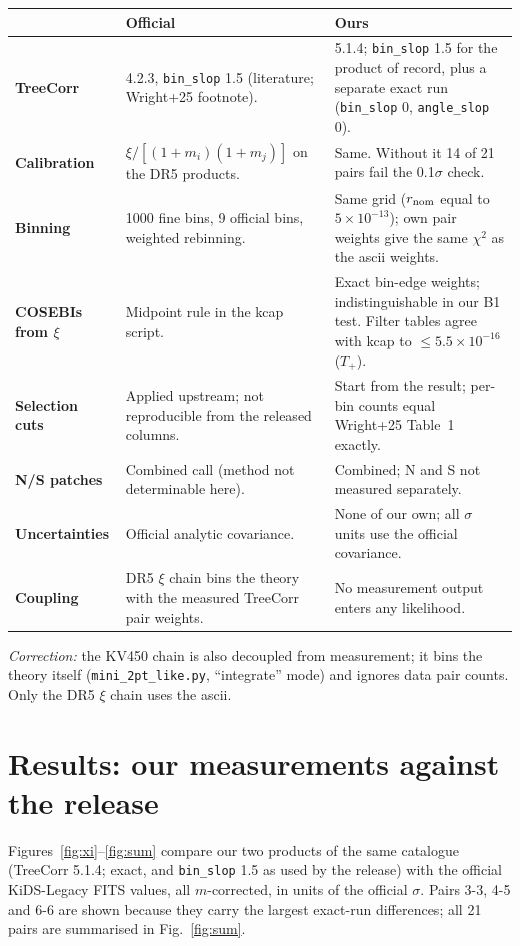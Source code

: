 \documentclass[10pt,a4paper]{article}
\newcommand{\file}[1]{{\small\texttt{#1}}}
\begin{document}
\begin{tabularx}{\textwidth}{@{}>{\bfseries}p{2.6cm}YY@{}}
\toprule
 & Official & Ours \\
\midrule
TreeCorr & 4.2.3, \texttt{bin\_slop} 1.5 (literature; Wright+25 footnote). & 5.1.4; \texttt{bin\_slop} 1.5 for the product of record, plus a separate exact run (\texttt{bin\_slop} 0, \texttt{angle\_slop} 0). \\
Calibration & $\xi/[(1+m_i)(1+m_j)]$ on the DR5 products. & Same. Without it 14 of 21 pairs fail the 0.1$\sigma$ check. \\
Binning & 1000 fine bins, 9 official bins, weighted rebinning. & Same grid ($r_{\rm nom}$ equal to $5\times10^{-13}$); own pair weights give the same $\chi^2$ as the ascii weights. \\
COSEBIs from $\xi$ & Midpoint rule in the kcap script. & Exact bin-edge weights; indistinguishable in our B1 test. Filter tables agree with kcap to $\le5.5\times10^{-16}$ ($T_+$). \\
Selection cuts & Applied upstream; not reproducible from the released columns. & Start from the result; per-bin counts equal Wright+25 Table~1 exactly. \\
N/S patches & Combined call (method not determinable here). & Combined; N and S not measured separately. \\
Uncertainties & Official analytic covariance. & None of our own; all $\sigma$ units use the official covariance. \\
Coupling & DR5 $\xi$ chain bins the theory with the measured TreeCorr pair weights. & No measurement output enters any likelihood. \\
\bottomrule
\end{tabularx}

\emph{Correction:} the KV450 chain is also decoupled from measurement; it bins the theory itself (\file{mini\_2pt\_like.py}, ``integrate'' mode) and ignores data pair counts. Only the DR5 $\xi$ chain uses the ascii.

\section{Results: our measurements against the release}
Figures~\ref{fig:xi}--\ref{fig:sum} compare our two products of the same catalogue (TreeCorr 5.1.4; exact, and \texttt{bin\_slop} 1.5 as used by the release) with the official KiDS-Legacy FITS values, all $m$-corrected, in units of the official $\sigma$. Pairs 3-3, 4-5 and 6-6 are shown because they carry the largest exact-run differences; all 21 pairs are summarised in Fig.~\ref{fig:sum}.
\end{document}
